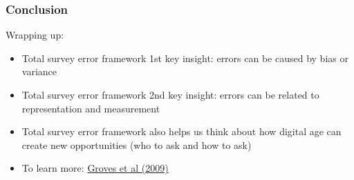 \documentclass[aspectratio=169]{beamer}
\begin{document}
\begin{frame}
\frametitle{Conclusion}

Wrapping up:
\pause
\begin{itemize}
\item Total survey error framework 1st key insight: errors can be caused by bias or variance
\pause
\item Total survey error framework 2nd key insight: errors can be related to representation and measurement
\pause
\item Total survey error framework also helps us think about how digital age can create new opportunities (who to ask and how to ask)
\pause 
\item To learn more: \href{https://www.amazon.com/Survey-Methodology-Robert-M-Groves/dp/0470465468}{Groves et al (2009)}
\end{itemize}

\end{frame}
\frame{\titlepage}
\end{document}
